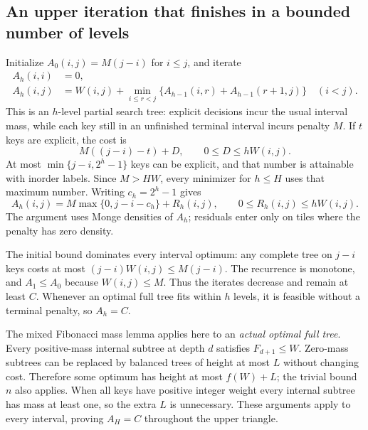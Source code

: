 \documentclass[11pt]{article}
\begin{document}
\subsection{An upper iteration that finishes in a bounded number of levels}\label{sec:penalty-iteration}
Initialize $A_0(i,j)=M(j-i)$ for $i\le j$, and iterate
\begin{align*}
 A_h(i,i)&=0,\\
 A_h(i,j)&=W(i,j)+\min_{i\le r<j}
       \{A_{h-1}(i,r)+A_{h-1}(r+1,j)\}\quad(i<j).
\end{align*}
This is an $h$-level partial search tree: explicit decisions incur the usual
interval mass, while each key still in an unfinished terminal interval
incurs penalty $M$. If $t$ keys are explicit, the cost is
\[
 M((j-i)-t)+D,\qquad 0\le D\le hW(i,j).
\]
At most $\min\{j-i,2^h-1\}$ keys can be explicit, and that number is
attainable with inorder labels. Since $M>HW$, every minimizer for
$h\le H$ uses that maximum number. Writing $c_h=2^h-1$ gives
\begin{equation}\label{eq:penalty-residual}
 A_h(i,j)=M\max\{0,j-i-c_h\}+R_h(i,j),\qquad
 0\le R_h(i,j)\le hW(i,j).
\end{equation}
The argument uses Monge densities of $A_h$; residuals enter only on tiles
where the penalty has zero density.

The initial bound dominates every interval optimum: any complete tree on
$j-i$ keys costs at most $(j-i)W(i,j)\le M(j-i)$. The recurrence is
monotone, and $A_1\le A_0$ because $W(i,j)\le M$. Thus the iterates
decrease and remain at least $C$. Whenever an optimal full tree fits
within $h$ levels, it is feasible without a terminal penalty, so $A_h=C$.

The mixed Fibonacci mass lemma applies here to an \emph{actual optimal
full tree}. Every positive-mass internal subtree at depth $d$ satisfies
$F_{d+1}\le W$. Zero-mass subtrees can be replaced by balanced trees of
height at most $L$ without changing cost. Therefore some optimum has
height at most $f(W)+L$; the trivial bound $n$ also applies. When all keys
have positive integer weight every internal subtree has mass at least one,
so the extra $L$ is unnecessary. These arguments apply to every interval,
proving $A_H=C$ throughout the upper triangle.
\end{document}
